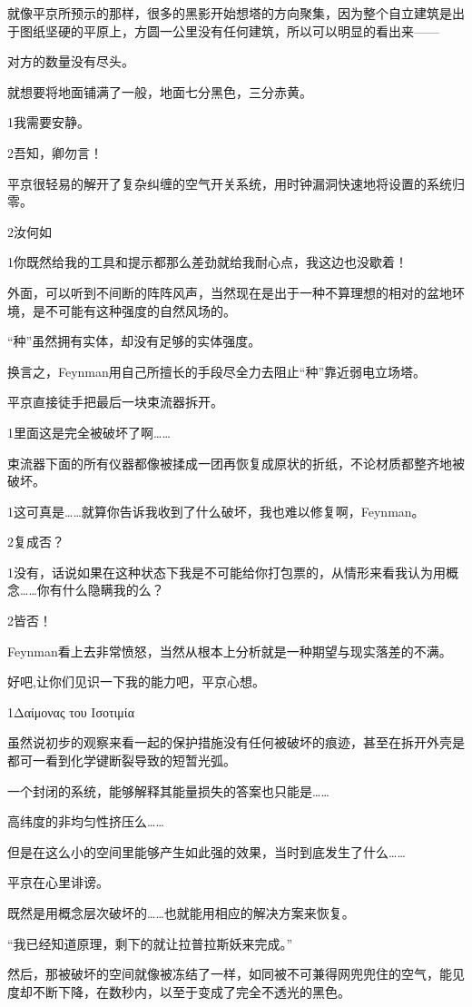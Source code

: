 \documentclass{article}
\begin{document}
就像平京所预示的那样，很多的黑影开始想塔的方向聚集，因为整个自立建筑是出于图纸坚硬的平原上，方圆一公里没有任何建筑，所以可以明显的看出来——

对方的数量没有尽头。

就想要将地面铺满了一般，地面七分黑色，三分赤黄。

1我需要安静。

2吾知，卿勿言！

平京很轻易的解开了复杂纠缠的空气开关系统，用时钟漏洞快速地将设置的系统归零。

2汝何如

1你既然给我的工具和提示都那么差劲就给我耐心点，我这边也没歇着！

外面，可以听到不间断的阵阵风声，当然现在是出于一种不算理想的相对的盆地环境，是不可能有这种强度的自然风场的。

“种”虽然拥有实体，却没有足够的实体强度。

换言之，Feynman用自己所擅长的手段尽全力去阻止“种”靠近弱电立场塔。

平京直接徒手把最后一块束流器拆开。

1里面这是完全被破坏了啊……

束流器下面的所有仪器都像被揉成一团再恢复成原状的折纸，不论材质都整齐地被破坏。

1这可真是……就算你告诉我收到了什么破坏，我也难以修复啊，Feynman。

2复成否？

1没有，话说如果在这种状态下我是不可能给你打包票的，从情形来看我认为用概念……你有什么隐瞒我的么？

2皆否！

Feynman看上去非常愤怒，当然从根本上分析就是一种期望与现实落差的不满。

好吧,让你们见识一下我的能力吧，平京心想。

1Δαίμονας του Ισοτιμία

虽然说初步的观察来看一起的保护措施没有任何被破坏的痕迹，甚至在拆开外壳是都可一看到化学键断裂导致的短暂光弧。

一个封闭的系统，能够解释其能量损失的答案也只能是……

高纬度的非均匀性挤压么……

但是在这么小的空间里能够产生如此强的效果，当时到底发生了什么……

平京在心里诽谤。

既然是用概念层次破坏的……也就能用相应的解决方案来恢复。

“我已经知道原理，剩下的就让拉普拉斯妖来完成。”

然后，那被破坏的空间就像被冻结了一样，如同被不可兼得网兜兜住的空气，能见度却不断下降，在数秒内，以至于变成了完全不透光的黑色。
\end{document}
